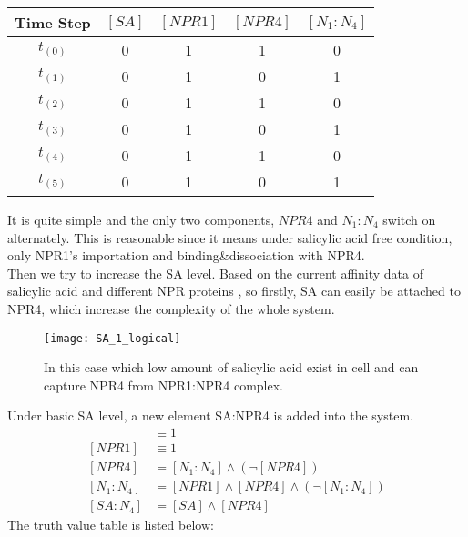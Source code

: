 \begin{tabular}[H]{c c c c c}
	\hline
	Time Step & \textsf{\textbf{$[SA]$}} &\textsf{\textbf{$[NPR1]$}} & \textsf{\textbf{$[NPR4]$}} & \textsf{\textbf{$[N_1:N_4]$}} \\
	\hline
	$t_{(0)}$ & 0 & 1 & 1 & 0 \\
	$t_{(1)}$ & 0 & 1 & 0 & 1 \\
	$t_{(2)}$ & 0 & 1 & 1 & 0 \\
	$t_{(3)}$ & 0 & 1 & 0 & 1 \\
	$t_{(4)}$ & 0 & 1 & 1 & 0 \\
	$t_{(5)}$ & 0 & 1 & 0 & 1 \\
	\hline
\end{tabular}
\linebreak
It is quite simple and the only two components, $NPR4$ and $N_1:N_4$ switch on alternately. This is reasonable since it means under salicylic acid free condition, only NPR1's importation and binding\&dissociation with NPR4. \\
Then we try to increase the SA level. Based on the current affinity data of salicylic acid and different NPR proteins \citep{fu2012npr3}, so firstly, SA can easily be attached to NPR4, which increase the complexity of the whole system.\\
\begin{figure}[H]
	\centering
	\texttt{[image: SA\_1\_logical]}
	\caption{In this case which low amount of salicylic acid exist in cell and can capture NPR4 from NPR1:NPR4 complex.}
	\label{fig:SA_1}
\end{figure}
Under basic SA level, a new element SA:NPR4 is added into the system. \\
\begin{align*}
[SA] &\equiv 1 \\
[NPR1] &\equiv 1 \\
[NPR4] &= [N_1:N_4] \wedge (\neg [NPR4]) \\
[N_1:N_4] &= [NPR1] \wedge[NPR4] \wedge (\neg [N_1:N_4]) \\
[SA:N_4] &= [SA] \wedge [NPR4]
\end{align*}
The truth value table is listed below: \\

